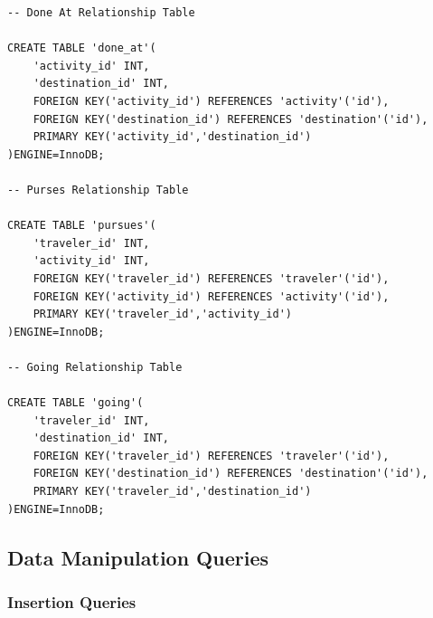 \documentclass[letterpaper,10pt,onecolumn,compsoc]{IEEEtran}
\begin{document}
\begin{verbatim}
-- Done At Relationship Table

CREATE TABLE 'done_at'(
	'activity_id' INT,
	'destination_id' INT,
	FOREIGN KEY('activity_id') REFERENCES 'activity'('id'),
	FOREIGN KEY('destination_id') REFERENCES 'destination'('id'),
	PRIMARY KEY('activity_id','destination_id')
)ENGINE=InnoDB;

-- Purses Relationship Table

CREATE TABLE 'pursues'(
	'traveler_id' INT,
	'activity_id' INT,
	FOREIGN KEY('traveler_id') REFERENCES 'traveler'('id'),
	FOREIGN KEY('activity_id') REFERENCES 'activity'('id'),
	PRIMARY KEY('traveler_id','activity_id')
)ENGINE=InnoDB;

-- Going Relationship Table

CREATE TABLE 'going'(
	'traveler_id' INT,
	'destination_id' INT,
	FOREIGN KEY('traveler_id') REFERENCES 'traveler'('id'),
	FOREIGN KEY('destination_id') REFERENCES 'destination'('id'),
	PRIMARY KEY('traveler_id','destination_id')
)ENGINE=InnoDB;
\end{verbatim}

\subsection{Data Manipulation Queries}


\subsubsection{Insertion Queries}
\end{document}
